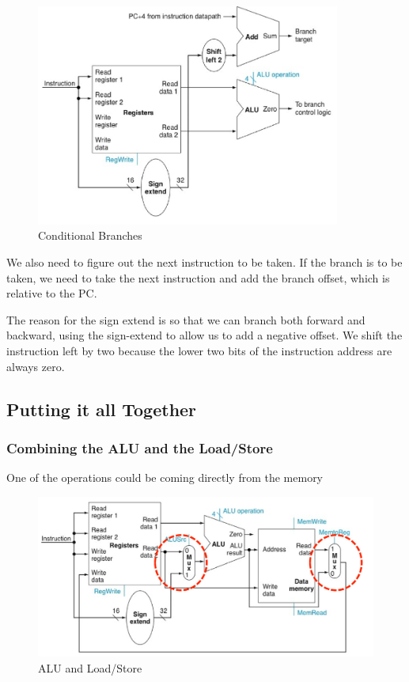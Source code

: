 \documentclass{article}
\begin{document}
\begin{figure}[ht!]
\centering
\includegraphics[width=100mm]{img/Branch.png}
\caption{Conditional Branches}
\end{figure}

We also need to figure out the next instruction to be taken. If the branch is to be taken, we need to take the next instruction and add the branch offset, which is relative to the PC.

The reason for the sign extend is so that we can branch both forward and backward, using the sign-extend to allow us to add a negative offset. We shift the instruction left by two because the lower two bits of the instruction address are always zero.

\subsection{Putting it all Together}

\subsubsection{Combining the ALU and the Load/Store}

One of the operations could be coming directly from the memory

\begin{figure}[ht!]
\centering
\includegraphics[width=120mm]{img/ALUandLoadStore.png}
\caption{ALU and Load/Store}
\end{figure}
\end{document}
